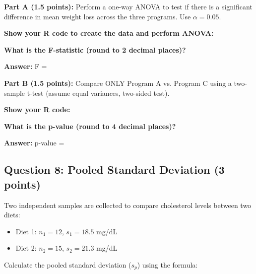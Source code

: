 \documentclass[11pt]{article}
\begin{document}
\vspace{0.3cm}

\textbf{Part A (1.5 points):} Perform a one-way ANOVA to test if there is a significant difference in mean weight loss across the three programs. Use $\alpha = 0.05$.

\vspace{0.3cm}

\textbf{Show your R code to create the data and perform ANOVA:}

\vspace{5cm}

\textbf{What is the F-statistic (round to 2 decimal places)?}

\vspace{0.3cm}

\textbf{Answer:} F = \underline{\hspace{3cm}}

\vspace{0.5cm}

\textbf{Part B (1.5 points):} Compare ONLY Program A vs. Program C using a two-sample t-test (assume equal variances, two-sided test).

\vspace{0.3cm}

\textbf{Show your R code:}

\vspace{4cm}

\textbf{What is the p-value (round to 4 decimal places)?}

\vspace{0.3cm}

\textbf{Answer:} p-value = \underline{\hspace{3cm}}

\vspace{1cm}

\subsection*{Question 8: Pooled Standard Deviation (3 points)}

Two independent samples are collected to compare cholesterol levels between two diets:

\begin{itemize}
\item Diet 1: $n_1 = 12$, $s_1 = 18.5$ mg/dL
\item Diet 2: $n_2 = 15$, $s_2 = 21.3$ mg/dL
\end{itemize}

Calculate the pooled standard deviation ($s_p$) using the formula:
\end{document}
